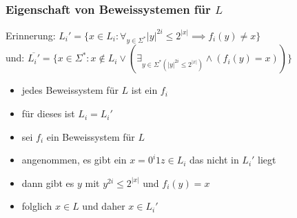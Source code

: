 \begin{frame}
  \frametitle{Eigenschaft von Beweissystemen für \(L\)}

  Erinnerung: \(L_i' = \{ x \in L_i : \forall_{y \in \Sigma^*} |y|^{2i} \leq 2^{|x|} \implies f_i(y) \neq x \}\) \\
  und: \(\overline{L_i'} = \{ x \in \Sigma^* : x \notin L_i \vee \left( \exists_{y \in \Sigma^* \left( |y|^{2i} \leq 2^{|x|} \right) } \wedge  \left( f_i(y) = x \right) \right)  \}\)
  
  \begin{itemize}
   \item<2-> jedes Beweissystem für \(L\) ist ein \(f_i\)
   \item<3-> für dieses ist \(L_i = L_i'\)
  \end{itemize}

  \begin{itemize}
    \item<4-> sei \(f_i\) ein Beweissystem für \(L\)
    \item<5-> angenommen, es gibt ein \(x = 0^i1z \in L_i\) das nicht in \(L_i'\) liegt
    \item<6-> dann gibt es \(y\) mit \(y^{2i} \leq 2^{|x|}\) und \(f_i(y) = x\)
    \item<7-> folglich \(x \in L\) und daher \(x \in L_i'\)
  \end{itemize}
\end{frame}

